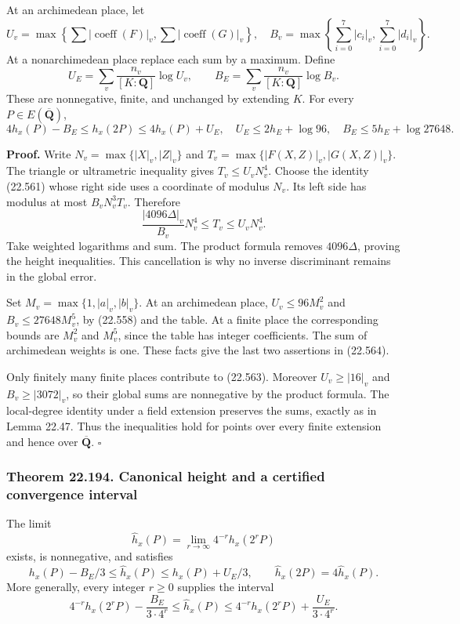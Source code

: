 \documentclass[
  11pt,
  a4paper,
]{article}
\begin{document}
At an archimedean place, let \[
 U_v=\max\left\{\sum|\operatorname{coeff}(F)|_v,
                         \sum|\operatorname{coeff}(G)|_v\right\},
 \quad
 B_v=\max\left\{\sum_{i=0}^7|c_i|_v,
                         \sum_{i=0}^7|d_i|_v\right\}.
 \tag{22.562}
\] At a nonarchimedean place replace each sum by a maximum. Define \[
 U_E=\sum_v\frac{n_v}{[K:\mathbf Q]}\log U_v,
 \qquad
 B_E=\sum_v\frac{n_v}{[K:\mathbf Q]}\log B_v.
 \tag{22.563}
\] These are nonnegative, finite, and unchanged by extending \(K\). For
every \(P\in E(\overline{\mathbf Q})\), \[
 4h_x(P)-B_E\le h_x(2P)\le4h_x(P)+U_E,
 \quad
 U_E\le2h_E+\log96,\quad B_E\le5h_E+\log27648.
 \tag{22.564}
\]

\textbf{Proof.} Write \(N_v=\max\{|X|_v,|Z|_v\}\) and
\(T_v=\max\{|F(X,Z)|_v,|G(X,Z)|_v\}\). The triangle or ultrametric
inequality gives \(T_v\le U_vN_v^4\). Choose the identity (22.561) whose
right side uses a coordinate of modulus \(N_v\). Its left side has
modulus at most \(B_vN_v^3T_v\). Therefore \[
 \frac{|4096\Delta|_v}{B_v}N_v^4\le T_v\le U_vN_v^4.
 \tag{22.565}
\] Take weighted logarithms and sum. The product formula removes
\(4096\Delta\), proving the height inequalities. This cancellation is
why no inverse discriminant remains in the global error.

Set \(M_v=\max\{1,|a|_v,|b|_v\}\). At an archimedean place,
\(U_v\le96M_v^2\) and \(B_v\le27648M_v^5\), by (22.558) and the table.
At a finite place the corresponding bounds are \(M_v^2\) and \(M_v^5\),
since the table has integer coefficients. The sum of archimedean weights
is one. These facts give the last two assertions in (22.564).

Only finitely many finite places contribute to (22.563). Moreover
\(U_v\ge|16|_v\) and \(B_v\ge|3072|_v\), so their global sums are
nonnegative by the product formula. The local-degree identity under a
field extension preserves the sums, exactly as in Lemma 22.47. Thus the
inequalities hold for points over every finite extension and hence over
\(\overline{\mathbf Q}\). \(\square\)

\subsubsection{Theorem 22.194. Canonical height and a certified
convergence
interval}\label{theorem-22.194.-canonical-height-and-a-certified-convergence-interval}

The limit \[
 \widehat h_x(P)=\lim_{r\to\infty}4^{-r}h_x(2^rP)
 \tag{22.566}
\] exists, is nonnegative, and satisfies \[
 h_x(P)-B_E/3\le\widehat h_x(P)\le h_x(P)+U_E/3,
 \qquad \widehat h_x(2P)=4\widehat h_x(P).
 \tag{22.567}
\] More generally, every integer \(r\ge0\) supplies the interval \[
 4^{-r}h_x(2^rP)-\frac{B_E}{3\cdot4^r}
 \le\widehat h_x(P)\le
 4^{-r}h_x(2^rP)+\frac{U_E}{3\cdot4^r}.
 \tag{22.568}
\]
\end{document}
